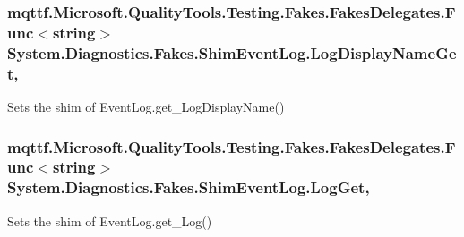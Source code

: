 \hypertarget{class_system_1_1_diagnostics_1_1_fakes_1_1_shim_event_log_ac14cedf3caf000773f72cf4a405b6a19}{
\subsubsection[{Log\-Display\-Name\-Get}]{\setlength{\rightskip}{0pt plus 5cm}mqttf.\-Microsoft.\-Quality\-Tools.\-Testing.\-Fakes.\-Fakes\-Delegates.\-Func$<$string$>$ System.\-Diagnostics.\-Fakes.\-Shim\-Event\-Log.\-Log\-Display\-Name\-Get\hspace{0.3cm}{\ttfamily [get]}, {\ttfamily [set]}}}\label{class_system_1_1_diagnostics_1_1_fakes_1_1_shim_event_log_ac14cedf3caf000773f72cf4a405b6a19}


Sets the shim of Event\-Log.\-get\-\_\-\-Log\-Display\-Name()

\hypertarget{class_system_1_1_diagnostics_1_1_fakes_1_1_shim_event_log_a34be34850bf50e1468eaf03be460cb06}{
\subsubsection[{Log\-Get}]{\setlength{\rightskip}{0pt plus 5cm}mqttf.\-Microsoft.\-Quality\-Tools.\-Testing.\-Fakes.\-Fakes\-Delegates.\-Func$<$string$>$ System.\-Diagnostics.\-Fakes.\-Shim\-Event\-Log.\-Log\-Get\hspace{0.3cm}{\ttfamily [get]}, {\ttfamily [set]}}}\label{class_system_1_1_diagnostics_1_1_fakes_1_1_shim_event_log_a34be34850bf50e1468eaf03be460cb06}


Sets the shim of Event\-Log.\-get\-\_\-\-Log()

